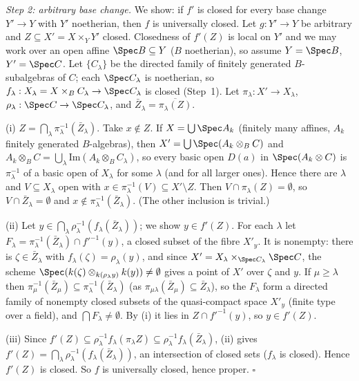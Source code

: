 \documentclass[11pt]{article}
\begin{document}
\emph{Step 2: arbitrary base change.} We show: if $f'$ is closed for every base change $Y'\to Y$ with $Y'$ noetherian, then $f$ is universally closed. Let $g:Y'\to Y$ be arbitrary and $Z\subseteq X'=X\times_YY'$ closed. Closedness of $f'(Z)$ is local on $Y'$ and we may work over an open affine $\Spec B\subseteq Y$ ($B$ noetherian), so assume $Y=\Spec B$, $Y'=\Spec C$. Let $\{C_\lambda\}$ be the directed family of finitely generated $B$-subalgebras of $C$; each $\Spec C_\lambda$ is noetherian, so $f_\lambda:X_\lambda=X\times_BC_\lambda\to\Spec C_\lambda$ is closed (Step~1). Let $\pi_\lambda:X'\to X_\lambda$, $\rho_\lambda:\Spec C\to\Spec C_\lambda$, and $\bar Z_\lambda=\overline{\pi_\lambda(Z)}$.

(i) $Z=\bigcap_\lambda\pi_\lambda^{-1}(\bar Z_\lambda)$. Take $x\notin Z$. If $X=\bigcup\Spec A_k$ (finitely many affines, $A_k$ finitely generated $B$-algebras), then $X'=\bigcup\Spec(A_k\otimes_BC)$ and $A_k\otimes_BC=\bigcup_\lambda\mathrm{Im}(A_k\otimes_BC_\lambda)$, so every basic open $D(a)$ in $\Spec(A_k\otimes C)$ is $\pi_\lambda^{-1}$ of a basic open of $X_\lambda$ for some $\lambda$ (and for all larger ones). Hence there are $\lambda$ and $V\subseteq X_\lambda$ open with $x\in\pi_\lambda^{-1}(V)\subseteq X'\setminus Z$. Then $V\cap\pi_\lambda(Z)=\emptyset$, so $V\cap\bar Z_\lambda=\emptyset$ and $x\notin\pi_\lambda^{-1}(\bar Z_\lambda)$. (The other inclusion is trivial.)

(ii) Let $y\in\bigcap_\lambda\rho_\lambda^{-1}(f_\lambda(\bar Z_\lambda))$; we show $y\in f'(Z)$. For each $\lambda$ let $F_\lambda=\pi_\lambda^{-1}(\bar Z_\lambda)\cap f'^{-1}(y)$, a closed subset of the fibre $X'_y$. It is nonempty: there is $\zeta\in\bar Z_\lambda$ with $f_\lambda(\zeta)=\rho_\lambda(y)$, and since $X'=X_\lambda\times_{\Spec C_\lambda}\Spec C$, the scheme $\Spec(k(\zeta)\otimes_{k(\rho_\lambda y)}k(y))\ne\emptyset$ gives a point of $X'$ over $\zeta$ and $y$. If $\mu\ge\lambda$ then $\pi_\mu^{-1}(\bar Z_\mu)\subseteq\pi_\lambda^{-1}(\bar Z_\lambda)$ (as $\pi_{\mu\lambda}(\bar Z_\mu)\subseteq\bar Z_\lambda$), so the $F_\lambda$ form a directed family of nonempty closed subsets of the quasi-compact space $X'_y$ (finite type over a field), and $\bigcap F_\lambda\neq\emptyset$. By (i) it lies in $Z\cap f'^{-1}(y)$, so $y\in f'(Z)$.

(iii) Since $f'(Z)\subseteq\rho_\lambda^{-1}f_\lambda(\pi_\lambda Z)\subseteq\rho_\lambda^{-1}f_\lambda(\bar Z_\lambda)$, (ii) gives $f'(Z)=\bigcap_\lambda\rho_\lambda^{-1}(f_\lambda(\bar Z_\lambda))$, an intersection of closed sets ($f_\lambda$ is closed). Hence $f'(Z)$ is closed. So $f$ is universally closed, hence proper. \hfill$\square$
\end{document}

